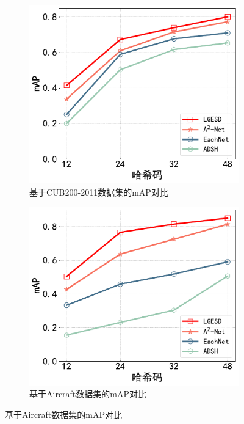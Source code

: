 \begin{figure}[h]
  \centering
  \begin{subfigure}{0.48\textwidth}
    \centering
    \includegraphics[width=\linewidth]{./Img/CUB-R50.pdf}
    \caption{基于CUB200-2011数据集的mAP对比}\label{fig:4-29}
  \end{subfigure}
  \hfil
  \begin{subfigure}{0.48\textwidth}
    \centering
    \includegraphics[width=\linewidth]{./Img/Aircraft-R50.pdf}
    \caption{基于Aircraft数据集的mAP对比}\label{fig:4-30}

\end{subfigure}
\end{figure}
